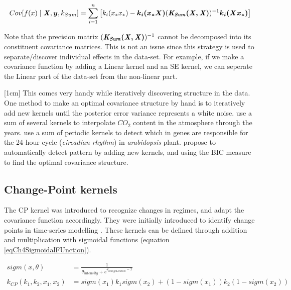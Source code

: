 \begin{equation}\label{eqCh5PosteriorSumVariance}
Cov[f(x) \mid \bm{\mathit{X}}, \boldsymbol{y}, k_{Sum}] = \sum_{i=1}^{n} \left[ k_{i}(x_{*}x_{*}) - \boldsymbol{k_{i}(x_{*}X)}( \bm{\mathit{K_{Sum}(X, X)}} )^{-1} \boldsymbol{k_{i}(Xx_{*})} \right ]
\end{equation}

Note that the precision matrix $( \bm{\mathit{K_{Sum}(X, X)}} )^{-1}$ cannot be decomposed into its constituent covariance matrices. This is not an issue since this strategy is used to separate/discover individual effects in the data-set. For example, if we make a covariance function by adding a Linear kernel and an SE kernel, we can seperate the Linear part of the data-set from the non-linear part. 

[1cm]
This comes very handy while iteratively discovering structure in the data. One method to make an optimal covariance structure by hand is to iteratively add new kernels until the posterior error variance represents a white noise. \cite{Rasmussen2005} use a sum of several kernels to interpolate $CO_{2}$ content in the atmosphere through the years. \cite{durrande2013gaussian} use a sum of periodic kernels to detect which in genes are responsible for the 24-hour cycle (\textit{circadian rhythm}) in \textit{arabidopsis} plant. \cite{duvenaud2013structure, lloyd2014automatic} propose to automatically detect pattern by adding new kernels, and using the BIC measure to find the optimal covariance structure. 

\subsection{Change-Point kernels}\label{subSecCh4CPKernel}
The CP kernel was introduced to recognize changes in regimes, and adapt the covariance function accordingly. They were initially introduced to identify change points in time-series modelling \cite{osborne2010bayesian, saatcci2010gaussian}. These kernels can be defined through addition and multiplication with sigmoidal functions (equation \ref{eqCh4SigmoidalFUnction}). 

\begin{align}
sigm(x, \theta) & = \frac{1}{\theta_{intensity} + e^{\theta_{changeLocation}-x}} \label{eqCh4SigmoidalFUnction} \\
k_{CP}(k_{1}, k_{2}, x_{1}, x_{2}) & = sigm(x_{1})k_{1}sigm(x_{2}) + (1-sigm(x_{1}))k_{2}(1-sigm(x_{2})) \label{eq:changePointKernel}
\end{align}

